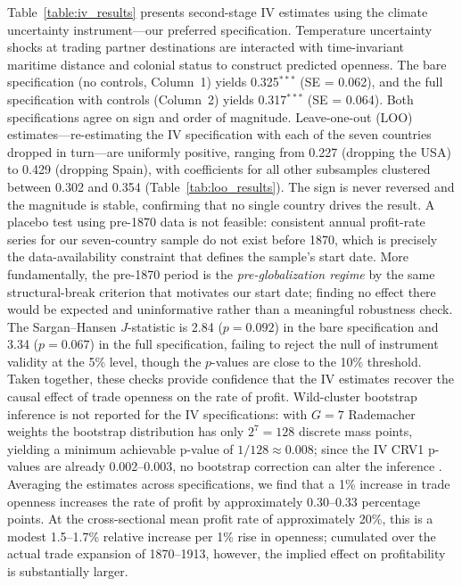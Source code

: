 \documentclass[10pt]{article}
\begin{document}
\par Table~\ref{table:iv_results} presents second-stage IV estimates using the climate uncertainty instrument---our preferred specification. Temperature uncertainty shocks at trading partner destinations are interacted with time-invariant maritime distance and colonial status to construct predicted openness. The bare specification (no controls, Column~1) yields 0.325$^{***}$ (SE = 0.062), and the full specification with controls (Column~2) yields 0.317$^{***}$ (SE = 0.064). Both specifications agree on sign and order of magnitude. Leave-one-out (LOO) estimates---re-estimating the IV specification with each of the seven countries dropped in turn---are uniformly positive, ranging from 0.227 (dropping the USA) to 0.429 (dropping Spain), with coefficients for all other subsamples clustered between 0.302 and 0.354 (Table~\ref{tab:loo_results}). The sign is never reversed and the magnitude is stable, confirming that no single country drives the result. A placebo test using pre-1870 data is not feasible: consistent annual profit-rate series for our seven-country sample do not exist before 1870, which is precisely the data-availability constraint that defines the sample's start date. More fundamentally, the pre-1870 period is the \emph{pre-globalization regime} by the same structural-break criterion that motivates our start date; finding no effect there would be expected and uninformative rather than a meaningful robustness check. The Sargan--Hansen $J$-statistic is 2.84 ($p=0.092$) in the bare specification and 3.34 ($p=0.067$) in the full specification, failing to reject the null of instrument validity at the 5\% level, though the $p$-values are close to the 10\% threshold. Taken together, these checks provide confidence that the IV estimates recover the causal effect of trade openness on the rate of profit. Wild-cluster bootstrap inference is not reported for the IV specifications: with $G=7$ Rademacher weights the bootstrap distribution has only $2^7=128$ discrete mass points, yielding a minimum achievable p-value of $1/128\approx0.008$; since the IV CRV1 p-values are already 0.002--0.003, no bootstrap correction can alter the inference \citep{cameronmillerguide2015}. Averaging the estimates across specifications, we find that a 1\% increase in trade openness increases the rate of profit by approximately 0.30--0.33 percentage points. At the cross-sectional mean profit rate of approximately 20\%, this is a modest 1.5--1.7\% relative increase per 1\% rise in openness; cumulated over the actual trade expansion of 1870--1913, however, the implied effect on profitability is substantially larger.
\end{document}
